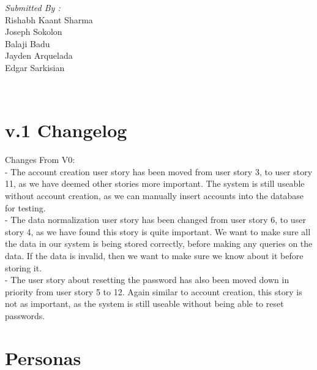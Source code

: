 \documentclass[12pt]{article}
\begin{document}
\begin{titlepage}
\begin{minipage}{0.4\textwidth}
			\begin{flushright} \large
			\emph{Submitted By :} \\
			Rishabh Kaant Sharma\\
            Joseph Sokolon\\
            Balaji Badu\\
            Jayden Arquelada\\
            Edgar Sarkisian\\
		\end{flushright}
        
	\end{minipage}\\[2 cm]
	
	
    
    
    
    
	
\end{titlepage}


\textcolor{black}{\tableofcontents}
\pagebreak

\section{v.1 Changelog}
Changes From V0:\\
- The account creation user story has been moved from user story 3, to user story 11, as we have deemed other stories more important. The system is still useable without account creation, as we can manually insert accounts into the database for testing.\\
- The data normalization user story has been changed from user story 6, to user story 4, as we have found this story is quite important. We want to make sure all the data in our system is being stored correctly, before making any queries on the data. If the data is invalid, then we want to make sure we know about it before storing it.\\
- The user story about resetting the password has also been moved down in priority from user story 5 to 12. Again similar to account creation, this story is not as important, as the system is still useable without being able to reset passwords.\\

\section{Personas}
\end{document}
